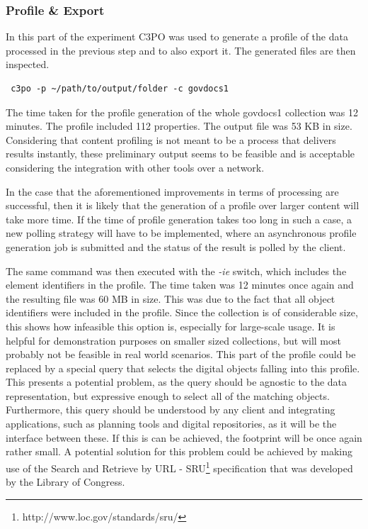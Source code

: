 \subsubsection{Profile \& Export}
In this part of the experiment C3PO was used to generate a profile of the data processed in the previous step and to also export it.
The generated files are then inspected.

\begin{verbatim}
 c3po -p ~/path/to/output/folder -c govdocs1
\end{verbatim}

The time taken for the profile generation of the whole govdocs1 collection was 12 minutes.
The profile included 112 properties. The output file was 53 KB in size.
Considering that content profiling is not meant to be a process that delivers results instantly, these preliminary output seems to be feasible and is acceptable considering the integration with other tools over a network.

In the case that the aforementioned improvements in terms of processing are successful, then it is likely that the generation of a profile over larger content will take more time.
If the time of profile generation takes too long in such a case, a new polling strategy will have to be implemented, where an asynchronous profile generation job is submitted and the status of the result is polled by the client.

The same command was then executed with the \textit{-ie} switch, which includes the element identifiers in the profile.
The time taken was 12 minutes once again and the resulting file was 60 MB in size.
This was due to the fact that all object identifiers were included in the profile.
Since the collection is of considerable size, this shows how infeasible this option is, especially for large-scale usage.
It is helpful for demonstration purposes on smaller sized collections, but will most probably not be feasible in real world scenarios.
This part of the profile could be replaced by a special query that selects the digital objects falling into this profile.
This presents a potential problem, as the query should be agnostic to the data representation, but expressive enough to select all of the matching objects.
Furthermore, this query should be understood by any client and integrating applications, such as planning tools and digital repositories, as it will be the interface between these.
If this is can be achieved, the footprint will be once again rather small. A potential solution for this problem could be achieved by making use of the Search and Retrieve by URL - SRU\footnote{http://www.loc.gov/standards/sru/} specification that was developed by the Library of Congress.

